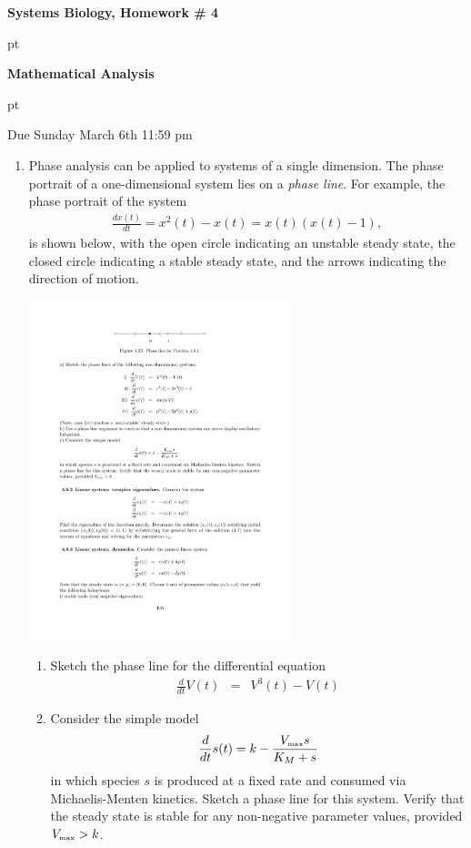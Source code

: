 \documentclass[12pt]{article}
\newcommand{\beqn}{\begin{eqnarray}}
\newcommand{\eeqn}{\end{eqnarray}}
\def \beqn {\begin{eqnarray*}}
\def \eeqn {\end{eqnarray*}}
\begin{document}
\centerline{\Large \bf Systems Biology, Homework \# 4}
 pt
\centerline{\Large \bf Mathematical Analysis}
 pt
\centerline{\Large  Due Sunday March 6th 11:59 pm}

\begin{enumerate}

\item Phase analysis can be applied to systems of a single dimension.  The phase portrait of a one-dimensional system lies on a  {\em phase line}.   For example, the phase portrait of the system 
\beqn
\frac{dx(t)}{dt} = x^2(t) - x(t) = x(t) (x(t)-1),
\eeqn
is shown below, with the open circle indicating an unstable steady state, the closed circle indicating a stable steady state, and the arrows indicating the direction of motion.

\begin{center}
\includegraphics[width=3in]{1dphase}
\end{center}

\begin{enumerate}
\item Sketch the phase line for the differential equation
\beqn
  \frac{d}{dt} V(t) &=& V^3(t) - V(t) 
\eeqn


\item Consider the simple model
\beqn
\frac{d}{dt} s(t) = k - \frac{V_{\mbox{\tiny max}} s}{K_M + s}
\eeqn
in which species $s$ is produced at a fixed rate and consumed via Michaelis-Menten kinetics.  Sketch a phase line for this system. Verify that the steady state is stable for any non-negative parameter values, provided  $V_{\mbox{\tiny max}} > k$.
\end{enumerate}


\end{enumerate}
\end{document}
